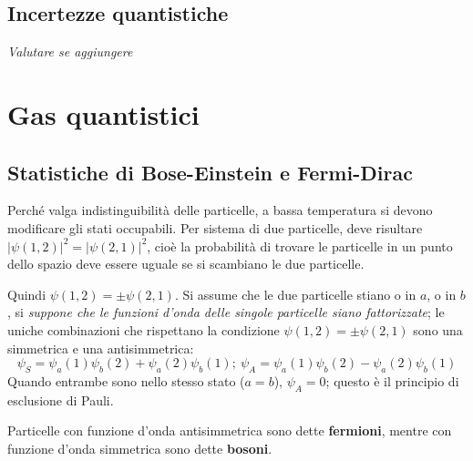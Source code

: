 \documentclass[10pt, a4paper]{scrartcl}
\numberwithin{equation}{subsection}
\theoremstyle{style1}
\newenvironment{boxenv}[1][]{
    \begin{eqbox}[#1]
    }{
   \end{eqbox}
}
\begin{document}
\subsection{Incertezze quantistiche}
\begin{boxenv}[]
	\centering \textit{Valutare se aggiungere} 
\end{boxenv}






















\newpage
\section{Gas quantistici}
\subsection{Statistiche di Bose-Einstein e Fermi-Dirac}
Perch\'e valga indistinguibilit\`a delle particelle, a bassa temperatura si devono modificare gli stati occupabili. Per sistema di due particelle, deve risultare $\lvert \psi (1,2) \rvert ^2 = \lvert \psi (2,1) \rvert ^2$, cio\`e la probabilit\`a di trovare le particelle in un punto dello spazio deve essere uguale se si scambiano le due particelle.

Quindi $\psi (1,2) = \pm \psi (2,1)$. Si assume che le due particelle stiano o in $a$, o in $b$, si \textit{suppone che le funzioni d'onda delle singole particelle siano fattorizzate}; le uniche combinazioni che rispettano la condizione $\psi (1,2) = \pm \psi (2,1)$ sono una simmetrica e una antisimmetrica:
\begin{equation}
		\psi _S = \psi _a (1) \psi _b (2) + \psi _a(2) \psi _b(1); \ \psi _A = \psi _a(1) \psi _b(2) - \psi _a(2) \psi _b(1)
\end{equation}
Quando entrambe sono nello stesso stato ($a=b$), $\psi _A = 0 $; questo \`e il principio di esclusione di Pauli. 

Particelle con funzione d'onda antisimmetrica sono dette \textbf{fermioni}, mentre con funzione d'onda simmetrica sono dette \textbf{bosoni}.
\end{document}
